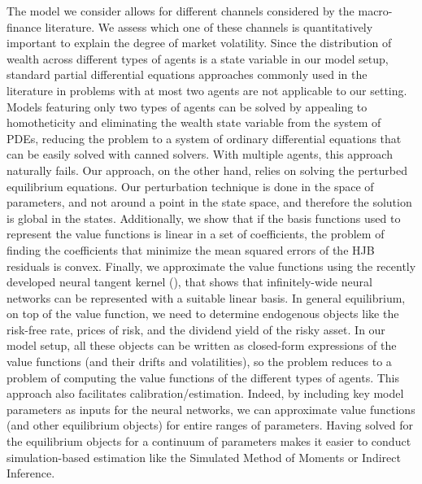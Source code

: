 The model we consider allows for different channels considered by the macro-finance literature. 
We assess which one of these channels is quantitatively important to explain the degree of market volatility. Since the distribution of wealth across different types of agents is a state variable in our model setup, standard partial differential equations approaches commonly used in the literature in problems with at most two agents are not applicable to our setting. Models featuring only two types of agents can be solved by appealing to homotheticity and eliminating the wealth state variable from the system of PDEs, reducing the problem to a system of ordinary differential equations that can be easily solved with canned solvers. With multiple agents, this approach naturally fails. Our approach, on the other hand, relies on solving the perturbed equilibrium equations. Our perturbation technique is done in the space of parameters, and not around a point in the state space, and therefore the solution is global in the states. Additionally, we show that if the basis functions used to represent the value functions is linear in a set of coefficients, the problem of finding the coefficients that minimize the mean squared errors of the HJB residuals is convex. Finally, we approximate the value functions using the recently developed neural tangent kernel (\citet{neural_tangent}), that shows that infinitely-wide neural networks can be represented with a suitable linear basis.
In general equilibrium, on top of the value function, we need to determine endogenous objects like the risk-free rate, prices of risk, and the dividend yield of the risky asset. In our model setup, all these objects can be written as closed-form expressions of the value functions (and their drifts and volatilities), so the problem reduces to a problem of computing the value functions of the different types of agents. 
This approach also facilitates calibration/estimation. Indeed, by including key model parameters as inputs for the neural networks, we can approximate value functions (and other equilibrium objects) for entire ranges of parameters. Having solved for the equilibrium objects for a continuum of parameters makes it easier to conduct simulation-based estimation like the Simulated Method of Moments or Indirect Inference.



\newpage
\singlespacing
%
\clearpage

